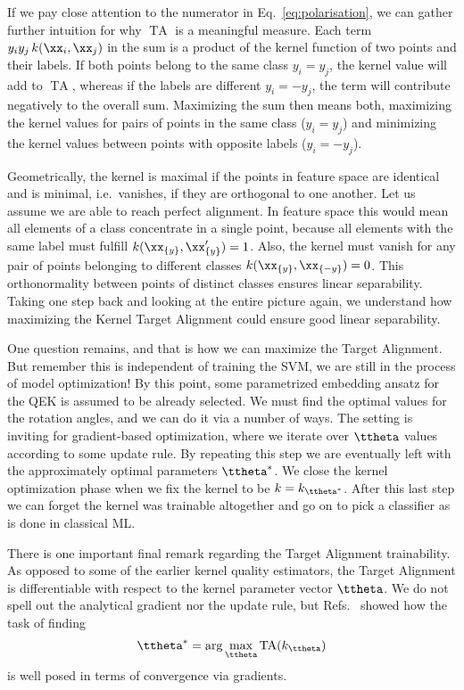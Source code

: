 \documentclass[twocolumn,superscriptaddress,nofootinbib]{revtex4-2}
\DeclareMathOperator{\TA}{TA} %
\begin{document}
    If we pay close attention to the numerator in Eq.~\ref{eq:polarisation}, we can gather further intuition for why $\TA$ is a meaningful measure.
    Each term $y_iy_j \, k(\xx_i,\xx_j)$ in the sum is a product of the kernel function of two points and their labels.
    If both points belong to the same class $y_i=y_j$, the kernel value will add to $\TA$, whereas if the labels are different $y_i=-y_j$, the term will contribute negatively to the overall sum.
    Maximizing the sum then means both, maximizing the kernel values for pairs of points in the same class ($y_i=y_j$) and minimizing the kernel values between points with opposite labels ($y_i=-y_j$).
    
    Geometrically, the kernel is maximal if the points in feature space are identical and is minimal, i.e.~vanishes, if they are orthogonal to one another.
    Let us assume we are able to reach perfect alignment.
    In feature space this would mean all elements of a class concentrate in a single point, because all elements with the same label must fulfill $k(\xx_{\{y\}},\xx'_{\{y\}}) = 1$.
    Also, the kernel must vanish for any pair of points belonging to different classes $k(\xx_{\{y\}},\xx_{\{-y\}}) = 0$.
    This orthonormality between points of distinct classes ensures linear separability.
    Taking one step back and looking at the entire picture again, we understand how maximizing the Kernel Target Alignment could ensure good linear separability.
    
    One question remains, and that is how we can maximize the Target Alignment.
    But remember this is independent of training the \ac{SVM}, we are still in the process of model optimization!
    By this point, some parametrized embedding ansatz for the \ac{QEK} is assumed to be already selected.
    We must find the optimal values for the rotation angles, and we can do it via a number of ways.
    The setting is inviting for gradient-based optimization, where we iterate over $\ttheta$ values according to some update rule.
    By repeating this step we are eventually left with the approximately optimal parameters $\ttheta^\ast$.
    We close the kernel optimization phase when we fix the kernel to be $k=k_{\ttheta^\ast}$.
    After this last step we can forget the kernel was trainable altogether and go on to pick a classifier as is done in classical \ac{ML}.
    
    There is one important final remark regarding the Target Alignment trainability.
    As opposed to some of the earlier kernel quality estimators, the Target Alignment is differentiable with respect to the kernel parameter vector $\ttheta$.
    We do not spell out the analytical gradient nor the update rule, but Refs.~\cite{camargo2009MulticlassKernelAlignment,guermeur2004KernelProtein,igel2007GradientOptimizationKTAlignment,Pothin2006GreedyOptimizingKernelAlignment,Pothin2007FeatureRepresentationKTAlignment} showed how the task of finding
    \begin{equation}
        \ttheta^\ast = \operatorname{arg}\max_{\ttheta} \TA(k_{\ttheta})
    \end{equation}
    is well posed in terms of convergence via gradients.
    
\end{document}
